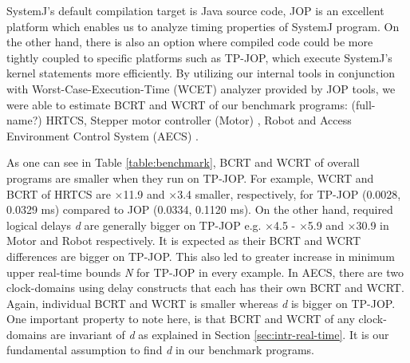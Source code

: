 SystemJ's default compilation target is Java source code, JOP is an
excellent platform which enables us to analyze timing properties of
SystemJ program. On the other hand, there is also an option where
compiled code could be more tightly coupled to specific platforms such
as TP-JOP, which execute SystemJ's kernel statements more
efficiently. By utilizing our internal tools in conjunction with
Worst-Case-Execution-Time (WCET) analyzer \cite{jop:jnl:jsa2007}
provided by JOP tools, we were able to estimate BCRT and WCRT of our
benchmark programs: (full-name?) HRTCS, Stepper motor controller (Motor)
\cite{}, Robot and Access Environment Control System (AECS) \cite{}.


As one can see in Table \ref{table:benchmark}, BCRT and WCRT of overall
programs are smaller when they run on TP-JOP. For example, WCRT and BCRT
of HRTCS are \(\times\)11.9 and \(\times\)3.4 smaller, respectively, for
TP-JOP (0.0028, 0.0329 ms) compared to JOP (0.0334, 0.1120 ms). On the
other hand, required logical delays \emph{d} are generally bigger on
TP-JOP e.g. \(\times\)4.5 - \(\times\)5.9 and \(\times\)30.9 in Motor
and Robot respectively. It is expected as their BCRT and WCRT
differences are bigger on TP-JOP.  This also led to greater increase in
minimum upper real-time bounds \emph{N} for TP-JOP in every example.  In
AECS, there are two clock-domains using delay constructs that each has
their own BCRT and WCRT. Again, individual BCRT and WCRT is smaller
whereas \emph{d} is bigger on TP-JOP. One important property to note
here, is that BCRT and WCRT of any clock-domains are invariant of
\emph{d} as explained in Section \ref{sec:intr-real-time}. It is our
fundamental assumption to find \emph{d} in our benchmark programs.

















